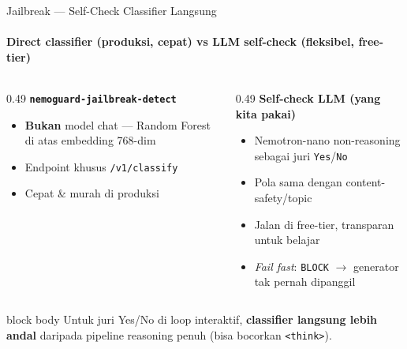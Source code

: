 \documentclass[aspectratio=169,t]{beamer}
\newcommand{\takeaway}[1]{%
  \vspace{0.3em}
  \begin{beamercolorbox}[rounded=true,shadow=false,sep=6pt]{block body}
    \centering\small\color{nvlightgreen}#1
  \end{beamercolorbox}%
}
\begin{document}
\begin{frame}{Jailbreak --- Self-Check Classifier Langsung}
  \framesubtitle{Direct classifier (produksi, cepat) vs LLM self-check (fleksibel, free-tier)}
  \begin{columns}[T]
    \begin{column}{0.49\textwidth}
      \textcolor{nvgreen}{\textbf{\texttt{nemoguard-jailbreak-detect}}}
      \begin{itemize}\footnotesize
        \item \textbf{Bukan} model chat --- Random Forest di atas embedding 768-dim
        \item Endpoint khusus \texttt{/v1/classify}
        \item Cepat \& murah di produksi
      \end{itemize}
    \end{column}
    \begin{column}{0.49\textwidth}
      \textcolor{nvorange}{\textbf{Self-check LLM (yang kita pakai)}}
      \begin{itemize}\footnotesize
        \item Nemotron-nano non-reasoning sebagai juri \texttt{Yes}/\texttt{No}
        \item Pola sama dengan content-safety/topic
        \item Jalan di free-tier, transparan untuk belajar
        \item \emph{Fail fast}: \texttt{BLOCK} $\to$ generator tak pernah dipanggil
      \end{itemize}
    \end{column}
  \end{columns}
  \takeaway{Untuk juri Yes/No di loop interaktif, \textbf{classifier langsung lebih andal} daripada pipeline reasoning penuh (bisa bocorkan \texttt{<think>}).}
\end{frame}
\end{document}
